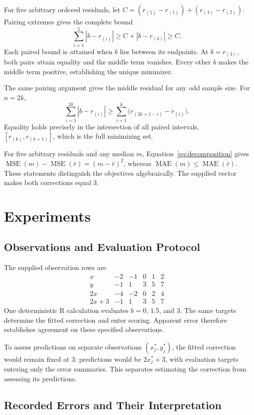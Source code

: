 \documentclass[11pt]{article}
\begin{document}
For five arbitrary ordered residuals, let
$C=(r_{(5)}-r_{(1)})+(r_{(4)}-r_{(2)})$.
Pairing extremes gives the complete bound
\[
\sum_{i=1}^{5}|b-r_{(i)}|
\geq C+|b-r_{(3)}|
\geq C.
\]
Each paired bound is attained when $b$ lies between its endpoints. At $b=r_{(3)}$, both pairs attain equality and the middle term vanishes. Every other $b$ makes the middle term positive, establishing the unique minimizer.

The same pairing argument gives the middle residual for any odd sample size. For $n=2k$,
\[
\sum_{i=1}^{2k}|b-r_{(i)}|
\geq
\sum_{i=1}^{k}\bigl(r_{(2k+1-i)}-r_{(i)}\bigr).
\]
Equality holds precisely in the intersection of all paired intervals,
$[r_{(k)},r_{(k+1)}]$, which is the full minimizing set.

For five arbitrary residuals and any median $m$, Equation~\ref{eq:decomposition} gives
$\operatorname{MSE}(m)-\operatorname{MSE}(\bar r)=(m-\bar r)^2$,
whereas $\operatorname{MAE}(m)\leq\operatorname{MAE}(\bar r)$.
These statements distinguish the objectives algebraically. The supplied vector makes both corrections equal $3$.

\section{Experiments}
\subsection{Observations and Evaluation Protocol}

The supplied observation rows are
\[
\begin{array}{c|rrrrr}
x & -2 & -1 & 0 & 1 & 2\\
y & -1 & 1 & 3 & 5 & 7\\
2x & -4 & -2 & 0 & 2 & 4\\
2x+3 & -1 & 1 & 3 & 5 & 7
\end{array}
\]
One deterministic R calculation \cite{Ihaka1996RLanguage} evaluates $b=0$, $1.5$, and $3$. The same targets determine the fitted correction and enter scoring. Apparent error therefore establishes agreement on these specified observations.

To assess predictions on separate observations $(x_j^*,y_j^*)$, the fitted correction would remain fixed at $3$: predictions would be $2x_j^*+3$, with evaluation targets entering only the error summaries. This separates estimating the correction from assessing its predictions.

\subsection{Recorded Errors and Their Interpretation}
\end{document}
